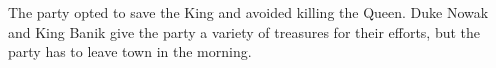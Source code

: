 The party opted to save the King and avoided killing the Queen.
Duke Nowak and King Banik give the party a variety of treasures for their efforts, but the party has to leave town in the morning.
